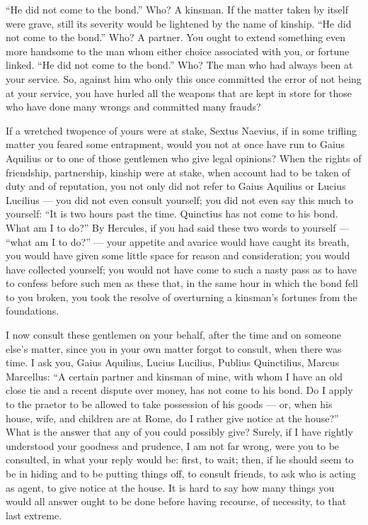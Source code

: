  ``He did not come to the bond.'' Who? A kinsman. If the matter taken by itself were grave, still its severity would be lightened by the name of kinship. ``He did not come to the bond.'' Who? A partner. You ought to extend something even more handsome to the man whom either choice associated with you, or fortune linked. ``He did not come to the bond.'' Who? The man who had always been at your service. So, against him who only this once committed the error of not being at your service, you have hurled all the weapons that are kept in store for those who have done many wrongs and committed many frauds?

 If a wretched twopence of yours were at stake, Sextus Naevius, if in some trifling matter you feared some entrapment, would you not at once have run to Gaius Aquilius or to one of those gentlemen who give legal opinions? When the rights of friendship, partnership, kinship were at stake, when account had to be taken of duty and of reputation, you not only did not refer to Gaius Aquilius or Lucius Lucilius --- you did not even consult yourself; you did not even say this much to yourself: ``It is two hours past the time. Quinctius has not come to his bond. What am I to do?'' By Hercules, if you had said these two words to yourself --- ``what am I to do?'' --- your appetite and avarice would have caught its breath, you would have given some little space for reason and consideration; you would have collected yourself; you would not have come to such a nasty pass as to have to confess before such men as these that, in the same hour in which the bond fell to you broken, you took the resolve of overturning a kinsman's fortunes from the foundations.

 I now consult these gentlemen on your behalf, after the time and on someone else's matter, since you in your own matter forgot to consult, when there was time. I ask you, Gaius Aquilius, Lucius Lucilius, Publius Quinctilius, Marcus Marcellus: ``A certain partner and kinsman of mine, with whom I have an old close tie and a recent dispute over money, has not come to his bond. Do I apply to the praetor to be allowed to take possession of his goods --- or, when his house, wife, and children are at Rome, do I rather give notice at the house?'' What is the answer that any of you could possibly give? Surely, if I have rightly understood your goodness and prudence, I am not far wrong, were you to be consulted, in what your reply would be: first, to wait; then, if he should seem to be in hiding and to be putting things off, to consult friends, to ask who is acting as agent, to give notice at the house. It is hard to say how many things you would all answer ought to be done before having recourse, of necessity, to that last extreme.

